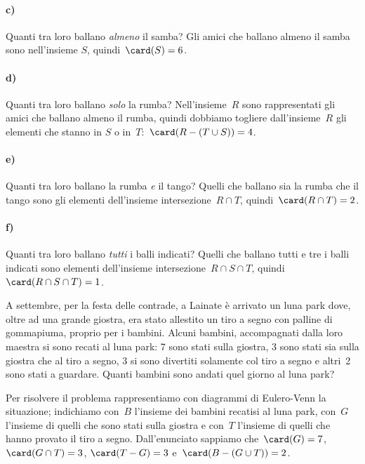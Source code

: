 \begin{exrig}
\begin{esempio}
\paragraph{c)} Quanti tra loro ballano \emph{almeno} il samba?
Gli amici che ballano almeno il samba sono nell'insieme
$S$, quindi~$\card(S)=6$.

\paragraph{d)} Quanti tra loro ballano \emph{solo} la rumba? Nell'insieme~$R$ sono rappresentati gli amici che
ballano almeno il rumba, quindi dobbiamo togliere dall'insieme~$R$ gli elementi che stanno in
$S$ o in~$T$:~$\card(R-(T\cup S))=4$.

\paragraph{e)} Quanti tra loro ballano la rumba \emph{e} il tango? Quelli che ballano sia la rumba che il tango sono gli elementi
dell'insieme intersezione~$R\cap T$, quindi~$\card(R\cap T)=2$.

\paragraph{f)} Quanti tra loro ballano \emph{tutti} i balli indicati? Quelli che ballano tutti e tre i balli indicati sono elementi
dell'insieme intersezione~$R\cap S\cap T$, quindi~$\card(R\cap S\cap T)=1$.
 \end{esempio}

 \begin{esempio}
 A settembre, per la festa delle contrade, a Lainate è arrivato un luna
park dove, oltre ad una grande giostra, era stato allestito un tiro a
segno con palline di gommapiuma, proprio per i bambini. Alcuni
bambini, accompagnati dalla loro maestra si sono recati al luna park: 7
sono stati sulla giostra, 3 sono stati sia sulla giostra che al tiro a
segno, 3 si sono divertiti solamente col tiro a segno e altri~2 sono
stati a guardare. Quanti bambini sono andati quel giorno al luna park?

\begin{multicols}{2}
Per risolvere il problema rappresentiamo con diagrammi di Eulero-Venn la situazione; indichiamo con~$B$ l'insieme dei
bambini recatisi al luna park, con~$G$ l'insieme di quelli che sono stati sulla giostra e con~$T$ l'insieme
di quelli che hanno provato il tiro a segno.
Dall'enunciato sappiamo che~$\card(G)=7$, $\card(G\cap T)=3$, $\card(T-G)=3$ e~$\card(B-(G\cup T))=2$.
\begin{center}
 
\end{center}
\end{multicols}


\end{esempio}
\end{exrig}
